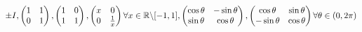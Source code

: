 \[ \pm I, \begin{pmatrix}
1&1\\0&1
\end{pmatrix}, \begin{pmatrix}
1&0\\1&1
\end{pmatrix},
\begin{pmatrix}
x&0\\
0&\frac{1}{x}
\end{pmatrix} \forall x\in \mathbb{R} \backslash [-1,1],
\begin{pmatrix}
\cos\theta&-\sin\theta\\
\sin\theta&\cos\theta
\end{pmatrix},
\begin{pmatrix}
\cos\theta&\sin\theta\\
-\sin\theta&\cos\theta
\end{pmatrix} \forall \theta \in (0,2\pi) \]
